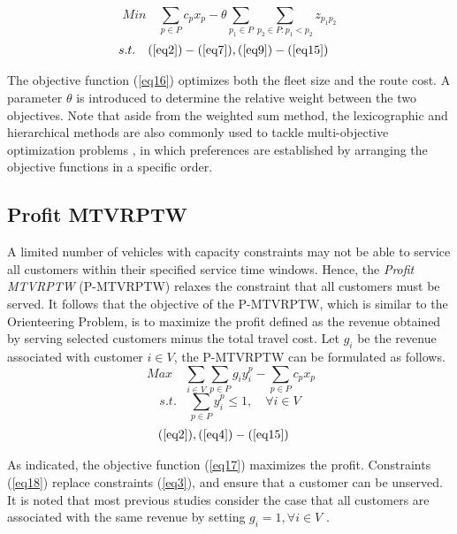 \begin{equation}
Min \quad
    \sum_{p \in P} c_p x_p - \theta \sum_{p_1 \in P} \sum_{p_2 \in P : p_1 < p_2} z_{{p_1}{p_2}} \label{eq16}
\end{equation}
\begin{align}
s.t. \quad (\ref{eq2})-(\ref{eq7})&, (\ref{eq9})-(\ref{eq15}) \nonumber
\end{align}

The objective function (\ref{eq16}) optimizes both the fleet size and the route cost.  A parameter $\theta$ is introduced to determine the relative weight between the two objectives.  Note that aside from the weighted sum method, the lexicographic and hierarchical methods are also commonly used to tackle multi-objective optimization problems \citep[e.g.,][]{arora2017multi}, in which preferences are established by arranging the objective functions in a specific order.

\subsection{Profit MTVRPTW}

A limited number of vehicles with capacity constraints may not be able to service all customers within their specified service time windows.  Hence, the \textit{Profit MTVRPTW} (P-MTVRPTW) relaxes the constraint that all customers must be served. It follows that the objective of the P-MTVRPTW, which is similar to the Orienteering Problem, is to maximize the profit defined as the revenue obtained by serving selected customers minus the total travel cost.  Let $g_i$ be the revenue associated with customer $i \in V$, the P-MTVRPTW can be formulated as follows.
\begin{equation} \ \label{eq17}
    Max \quad \sum_{i \in V} \sum_{p \in P} g_i y^p_i - \sum_{p \in P} c_p x_p
\end{equation}
\begin{equation} \label{eq18}
    s.t. \quad \sum_{p \in P} y^p_i \leq 1, \quad \forall i \in V
\end{equation}
\begin{align}
(\ref{eq2})&, (\ref{eq4})-(\ref{eq15}) \nonumber
\end{align}

As indicated, the objective function (\ref{eq17}) maximizes the profit. Constraints (\ref{eq18}) replace constraints (\ref{eq3}), and ensure that a customer can be unserved. It is noted that most previous studies consider the case that all customers are associated with the same revenue by setting $g_i = 1, \forall i \in V$ \citep[e.g.,][]{azi2010exact, macedo2011solving, macedo2012generalized, wang2014metaheuristic}.


